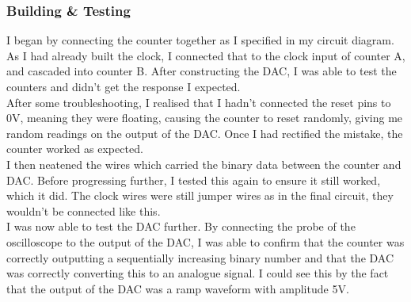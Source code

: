 \subsubsection{Building \& Testing}
I began by connecting the counter together as I specified in my circuit diagram. As I had already built the clock, I connected that to the clock input of counter A, and cascaded into counter B. After constructing the DAC, I was able to test the counters and didn’t get the response I expected.\\ After some troubleshooting, I realised that I hadn’t connected the reset pins to 0V, meaning they were floating, causing the counter to reset randomly, giving me random readings on the output of the DAC. Once I had rectified the mistake, the counter worked as expected.\\
\noindent I then neatened the wires which carried the binary data between the counter and DAC. Before progressing further, I tested this again to ensure it still worked, which it did. The clock wires were still jumper wires as in the final circuit, they wouldn't be connected like this.\\
\noindent I was now able to test the DAC further. By connecting the probe of the oscilloscope to the output of the DAC, I was able to confirm that the counter was correctly outputting a sequentially increasing binary number and that the DAC was correctly converting this to an analogue signal. I could see this by the fact that the output of the DAC was a ramp waveform with amplitude 5V. 
